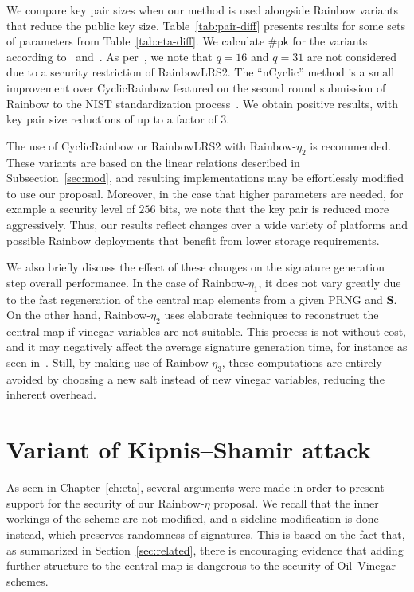 \documentclass[12pt, a4paper, oneside]{memoir}
\theoremstyle{definition}
\begin{document}
We compare key pair sizes when our method is used alongside Rainbow variants that reduce the public key size. Table~\ref{tab:pair-diff} presents results for some sets of parameters from Table~\ref{tab:eta-diff}. We calculate $\#\mathsf{pk}$ for the variants according to~\cite[Eqs.~9.2,~9.4]{Petzoldt:201307} and~\cite{Petzoldt:202004}. As per~\cite[Remark~9.1]{Petzoldt:201307}, we note that $q = 16$ and $q = 31$ are not considered due to a security restriction of RainbowLRS2. The ``nCyclic'' method is a small improvement over CyclicRainbow featured on the second round submission of Rainbow to the NIST standardization process~\cite{Ding:201901}. We obtain positive results, with key pair size reductions of up to a factor of 3.

The use of CyclicRainbow or RainbowLRS2 with Rainbow-$\eta_{2}$ is recommended. These variants are based on the linear relations described in Subsection~\ref{sec:mod}, and resulting implementations may be effortlessly modified to use our proposal. Moreover, in the case that higher parameters are needed, for example a security level of $256$ bits, we note that the key pair is reduced more aggressively. Thus, our results reflect changes over a wide variety of platforms and possible Rainbow deployments that benefit from lower storage requirements.

We also briefly discuss the effect of these changes on the signature generation step overall performance. In the case of Rainbow-$\eta_{1}$, it does not vary greatly due to the fast regeneration of the central map elements from a given PRNG and $\mathbf{S}$. On the other hand, Rainbow-$\eta_{2}$ uses elaborate techniques to reconstruct the central map if vinegar variables are not suitable. This process is not without cost, and it may negatively affect the average signature generation time, for instance as seen in~\cite{Petzoldt:202004}. Still, by making use of Rainbow-$\eta_{3}$, these computations are entirely avoided by choosing a new salt instead of new vinegar variables, reducing the inherent overhead.

\chapter{Variant of Kipnis--Shamir attack}\label{ch:attack}

As seen in Chapter~\ref{ch:eta}, several arguments were made in order to present support for the security of our Rainbow-$\eta$ proposal. We recall that the inner workings of the scheme are not modified, and a sideline modification is done instead, which preserves randomness of signatures. This is based on the fact that, as summarized in Section~\ref{sec:related}, there is encouraging evidence that adding further structure to the central map is dangerous to the security of Oil--Vinegar schemes. 
\end{document}
